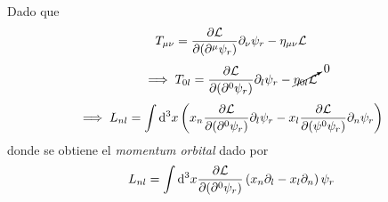 Dado que
\begin{equation}
  T_{\mu\nu }=\pdv{\mathcal{L}}{(\partial^\mu\psi_r)}\partial_\nu \psi_r-\eta_{\mu\nu }\mathcal{L} 
\end{equation}
\begin{equation}
 \implies T_{0l}=\pdv{\mathcal{L}}{(\partial^0 \psi_r)}\partial_l\psi_r-\cancelto{0}{\eta_{0l}\mathcal{L} }
\end{equation}
\begin{equation}
  \implies L_{nl}=\int\dd^3x\left(x_n\pdv{\mathcal{L}}{(\partial^0 \psi_r)}\partial_l\psi_r-x_l\pdv{\mathcal{L}}{(\psi^0 \psi_r)}\partial_n\psi_r\right)
\end{equation}
donde se obtiene el \textit{momentum orbital} dado por
\begin{equation}
  L_{nl}=\int\dd^3x\pdv{\mathcal{L}}{(\partial^0\psi_r)}\left(x_n\partial_l-x_l\partial_n\right)\psi_r
\end{equation}































































































